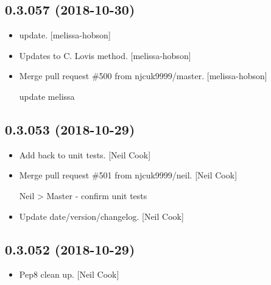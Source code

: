 \documentclass[a4paper,10pt,english]{report}
\begin{document}
\subsection{0.3.057 (2018-10-30)}
\label{\detokenize{misc/changelog:id278}}\begin{itemize}
\item {} 
 update. {[}melissa-hobson{]}

\item {} 
Updates to C. Lovis method. {[}melissa-hobson{]}

\item {} 
Merge pull request \#500 from njcuk9999/master. {[}melissa-hobson{]}

update melissa

\end{itemize}


\subsection{0.3.053 (2018-10-29)}
\label{\detokenize{misc/changelog:id279}}\begin{itemize}
\item {} 
Add  back to unit tests. {[}Neil Cook{]}

\item {} 
Merge pull request \#501 from njcuk9999/neil. {[}Neil Cook{]}

Neil \textendash{}\textgreater{} Master - confirm unit tests

\item {} 
Update date/version/changelog. {[}Neil Cook{]}

\end{itemize}


\subsection{0.3.052 (2018-10-29)}
\label{\detokenize{misc/changelog:id280}}\begin{itemize}
\item {} 
Pep8 clean up. {[}Neil Cook{]}

\end{itemize}
\end{document}
